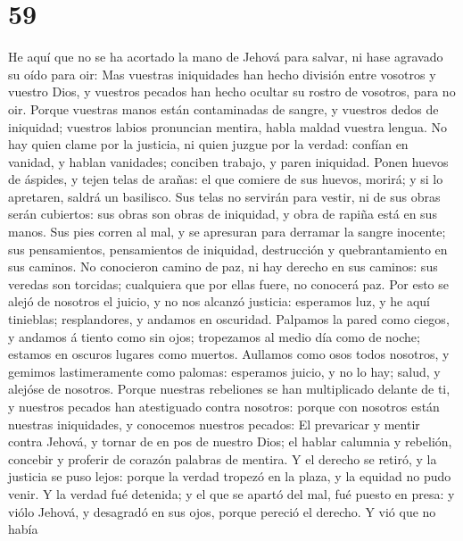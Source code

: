\hypertarget{section-58}{%
\section{59}\label{section-58}}

 He aquí que no se ha acortado la mano de Jehová para
salvar, ni hase agravado su oído para oir:  Mas vuestras
iniquidades han hecho división entre vosotros y vuestro Dios, y vuestros
pecados han hecho ocultar su rostro de vosotros, para no oir.
 Porque vuestras manos están contaminadas de sangre, y
vuestros dedos de iniquidad; vuestros labios pronuncian mentira, habla
maldad vuestra lengua.  No hay quien clame por la justicia,
ni quien juzgue por la verdad: confían en vanidad, y hablan vanidades;
conciben trabajo, y paren iniquidad.  Ponen huevos de
áspides, y tejen telas de arañas: el que comiere de sus huevos, morirá;
y si lo apretaren, saldrá un basilisco.  Sus telas no
servirán para vestir, ni de sus obras serán cubiertos: sus obras son
obras de iniquidad, y obra de rapiña está en sus manos.  Sus
pies corren al mal, y se apresuran para derramar la sangre inocente; sus
pensamientos, pensamientos de iniquidad, destrucción y quebrantamiento
en sus caminos.  No conocieron camino de paz, ni hay derecho
en sus caminos: sus veredas son torcidas; cualquiera que por ellas
fuere, no conocerá paz.  Por esto se alejó de nosotros el
juicio, y no nos alcanzó justicia: esperamos luz, y he aquí tinieblas;
resplandores, y andamos en oscuridad.  Palpamos la pared
como ciegos, y andamos á tiento como sin ojos; tropezamos al medio día
como de noche; estamos en oscuros lugares como muertos. 
Aullamos como osos todos nosotros, y gemimos lastimeramente como
palomas: esperamos juicio, y no lo hay; salud, y alejóse de nosotros.
 Porque nuestras rebeliones se han multiplicado delante de
ti, y nuestros pecados han atestiguado contra nosotros: porque con
nosotros están nuestras iniquidades, y conocemos nuestros pecados:
 El prevaricar y mentir contra Jehová, y tornar de en pos
de nuestro Dios; el hablar calumnia y rebelión, concebir y proferir de
corazón palabras de mentira.  Y el derecho se retiró, y la
justicia se puso lejos: porque la verdad tropezó en la plaza, y la
equidad no pudo venir.  Y la verdad fué detenida; y el que
se apartó del mal, fué puesto en presa: y viólo Jehová, y desagradó en
sus ojos, porque pereció el derecho.  Y vió que no había
